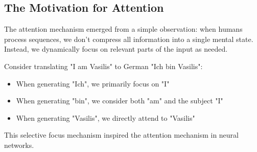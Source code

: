 \subsection{The Motivation for Attention}

The attention mechanism emerged from a simple observation: when humans process sequences, we don't compress all information into a single mental state. Instead, we dynamically focus on relevant parts of the input as needed.

Consider translating "I am Vasilis" to German "Ich bin Vasilis":
\begin{itemize}
    \item When generating "Ich", we primarily focus on "I"
    \item When generating "bin", we consider both "am" and the subject "I"
    \item When generating "Vasilis", we directly attend to "Vasilis"
\end{itemize}

This selective focus mechanism inspired the attention mechanism in neural networks.
